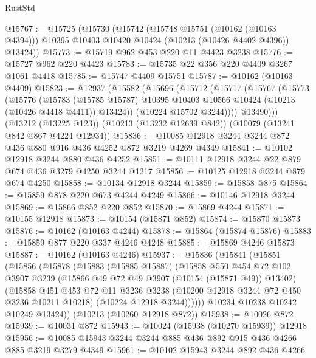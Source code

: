 \begin{lexlean}{RustStd}
\begin{coremodule}
@15767 := @15725
    (@15730
      (@15742
        (@15748 @15751 (@10162 (@10163 @4394)))
        @10395
        @10403
        @10420
        @10424
        (@10213 (@10426 @4402 @4396))
        @13424))
@15773 := @15719 @962 @453 @220 @11 @4423 @3238
@15776 := @15727 @962 @220 @4423
@15783 := @15735 @22 @356 @220 @4409 @3267 @1061 @4418
@15785 := @15747 @4409 @15751
@15787 := @10162 (@10163 @4409)
@15823 := @12937
    (@15582
      (@15696
        (@15712
          (@15717
            (@15767
              (@15773
                (@15776
                  (@15783
                    (@15785 @15787)
                    @10395
                    @10403
                    @10566
                    @10424
                    (@10213 (@10426 @4418 @4411))
                    @13424))
                (@10224 @15702 @3244))))
          @13490)))
    (@13212 (@13225 @123))
    (@10213 (@13232 @12639 @842))
    (@10079 (@13241 @842 @867 @4224 @12934))
@15836 := @10085 @12918 @3244 @3244 @872 @436 @880 @916 @436 @4252 @872 @3219 @4269 @4349
@15841 := @10102 @12918 @3244 @880 @436 @4252
@15851 := @10111 @12918 @3244 @22 @879 @674 @436 @3279 @4250 @3244 @1217
@15856 := @10125 @12918 @3244 @879 @674 @4250
@15858 := @10134 @12918 @3244
@15859 := @15858 @875
@15864 := @15859 @878 @220 @673 @4244 @4249
@15866 := @10146 @12918 @3244
@15869 := @15866 @852 @220 @852
@15870 := @15869 @4244
@15871 := @10155 @12918
@15873 := @10154 (@15871 @852)
@15874 := @15870 @15873
@15876 := @10162 (@10163 @4244)
@15878 := @15864 (@15874 @15876)
@15883 := @15859 @877 @220 @337 @4246 @4248
@15885 := @15869 @4246 @15873
@15887 := @10162 (@10163 @4246)
@15937 := @15836
    (@15841
      (@15851
        (@15856
          (@15878
            (@15883
              (@15885 @15887)
              (@15858
                @550
                @454
                @72
                @102
                @3907
                @3239
                (@15866 @49 @72 @49 @3907 (@10154 (@15871 @49)) @13402)
                (@15858
                  @451
                  @453
                  @72
                  @11
                  @3236
                  @3238
                  (@10200 @12918 @3244 @72 @450 @3236 @10211 @10218)
                  (@10224 @12918 @3244))))))
        @10234
        @10238
        @10242
        @10249
        @13424))
    (@10213 (@10260 @12918 @872))
@15938 := @10026 @872
@15939 := @10031 @872
@15943 := @10024 (@15938 (@10270 @15939)) @12918
@15956 := @10085 @15943 @3244 @3244 @885 @436 @892 @915 @436 @4266 @885 @3219 @3279 @4349
@15961 := @10102 @15943 @3244 @892 @436 @4266

\end{coremodule}
\end{lexlean}
